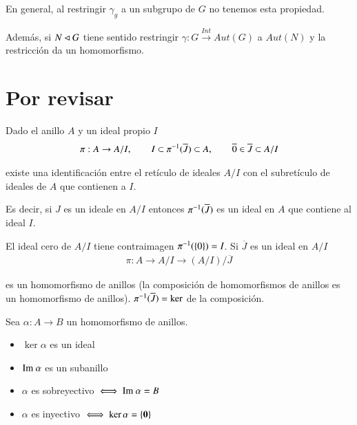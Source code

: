 En general, al restringir $\gamma_g$ a un subgrupo de $G$ no tenemos esta propiedad.

Además, si $N \lhd G$ tiene sentido restringir $\gamma: G \xrightarrow{Int} Aut(G)$ a $Aut(N)$ y la restricción da un homomorfismo.

\section{Por revisar}


\begin{thm}
	Dado el anillo $A$ y un ideal propio $I$
	\begin{align*}
	\pi: A \to A/I,\qquad I \subset \pi^{-1}(\overline{J}) \subset A,\qquad \overline{0} \in \overline{J} \subset A / I
	\end{align*}
	
	existe una identificación entre el retículo de ideales $A / I$ con el subretículo de ideales de $A$ que contienen a $I$. 
	
	Es decir, si $J$ es un ideale en $A/I$ entonces $\pi^{-1}(\overline{J})$ es un ideal en $A$ que contiene al ideal $I$.
\end{thm}


El ideal cero de $A/I$ tiene contraimagen $\pi^{-1}(\{0\}) = I$. Si $\overline{J}$ es un ideal en $A/I$
\begin{align*}
\pi : A \to A/I \to (A/I) / \overline{J}
\end{align*}

es un homomorfismo de anillos (la composición de homomorfismos de anillos es un homomorfismo de anillos). $\pi^{-1}(\overline{J}) = \ker$ de la composición.


\begin{thm}
	Sea $\alpha: A \to B$ un homomorfismo de anillos.
	\begin{itemize}
		\item $\ker \alpha$ es un ideal
		\item $\text{Im } \alpha$ es un subanillo
		\item $\alpha$ es sobreyectivo $\iff \text{Im } \alpha = B$
		\item $\alpha$ es inyectivo $\iff \ker \alpha = \{\mathbf{0}\}$
	\end{itemize}
\end{thm}

